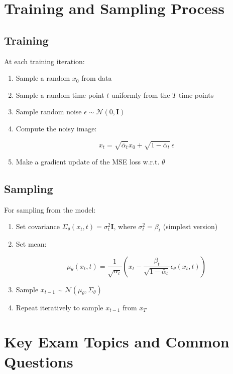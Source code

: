 \section{Training and Sampling Process}


\subsection*{Training}
At each training iteration:
\begin{enumerate}
    \item Sample a random $x_0$ from data
    \item Sample a random time point $t$ uniformly from the $T$ time points
    \item Sample random noise $\epsilon \sim \mathcal{N}(0, \mathbf{I})$
    \item Compute the noisy image:
\begin{definition}    \[
    x_t = \sqrt{\bar{\alpha}_t} x_0 + \sqrt{1 - \bar{\alpha}_t} \, \epsilon
    \]\end{definition}
    \item Make a gradient update of the MSE loss w.r.t. $\theta$
\end{enumerate}

\subsection*{Sampling}
For sampling from the model:
\begin{enumerate}
    \item Set covariance $\Sigma_\theta(x_t, t) = \sigma_t^2 \mathbf{I}$, where $\sigma_t^2 = \beta_t$ (simplest version)
    \item Set mean:
    \begin{definition}

    
    \[
    \mu_\theta(x_t, t) = \frac{1}{\sqrt{\alpha_t}} \left(x_t - \frac{\beta_t}{\sqrt{1 - \bar{\alpha}_t}} \epsilon_\theta(x_t, t)\right)
    \]
    \end{definition}
    \item Sample $x_{t-1} \sim \mathcal{N}(\mu_\theta, \Sigma_\theta)$
    \item Repeat iteratively to sample $x_{t-1}$ from $x_T$
\end{enumerate}

\section{Key Exam Topics and Common Questions}

